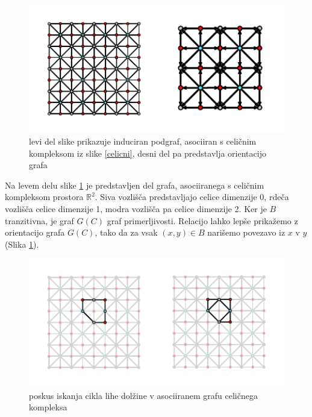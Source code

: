 \documentclass[a4paper, 12pt]{book}
\theoremstyle{definition}
\theoremstyle{remark}
\begin{document}
\begin{figure}[h]
  \begin{center}
    \includegraphics[width=1\textwidth]{r2-cell-graph.pdf}
    \end{center}
    \caption{levi del slike prikazuje induciran podgraf, asociiran s celičnim kompleksom
    iz slike \ref{celicni}, desni del pa predstavlja orientacijo grafa}
    \label{celicni-graf}
\end{figure}
Na levem delu slike \ref{celicni-graf} je predstavljen del grafa, asociiranega s celičnim
kompleksom prostora $\mathbb{R}^2$. Siva vozlišča predstavljajo celice dimenzije 0, rdeča
vozlišča celice dimenzije 1, modra vozlišča pa celice dimenzije 2.
Ker je $B$ tranzitivna, je graf $G(C)$ graf primerljivosti. 
Relacijo lahko lepše prikažemo z orientacijo grafa $G(C)$, tako da za vsak
$(x,y) \in B$ narišemo povezavo iz $x$ v $y$ (Slika \ref{celicni-graf}).
\begin{figure}[h]
  \begin{center}
  \includegraphics[width=1\textwidth]{odd-circle-r2-cell.pdf}
  \end{center}
  \caption{poskus iskanja cikla lihe dolžine v asociiranem grafu celičnega kompleksa}
  \label{fail-celicni-graf}
\end{figure}
\end{document}
